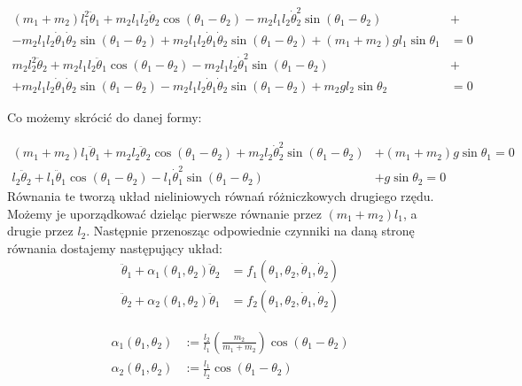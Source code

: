 \documentclass[]{article}
\begin{document}
		\begin{align*}
		(m_1 + m_2) l_1^2 \ddot{\theta}_1 + m_2 l_1 l_2 \ddot{\theta}_2 \cos(\theta_1 - \theta_2)  
		- m_2 l_1 l_2 \dot{\theta}_2^2 \sin(\theta_1 - \theta_2)&+\\
		- m_2 l_1 l_2 \dot{\theta}_1 \dot{\theta}_2 \sin(\theta_1 - \theta_2)+ m_2 l_1 l_2 \dot{\theta}_1 \dot{\theta}_2 \sin(\theta_1 - \theta_2) + (m_1 + m_2) g l_1 \sin \theta_1 &= 0 \\
		m_2 l_2^2 \ddot{\theta}_2 + m_2 l_1 l_2 \ddot{\theta}_1 \cos(\theta_1 - \theta_2) - m_2 l_1 l_2 \dot{\theta}_1^2 \sin(\theta_1 - \theta_2) &+\\
		+m_2 l_1 l_2 \dot{\theta}_1 \dot{\theta}_2 \sin(\theta_1 - \theta_2)-m_2 l_1 l_2 \dot{\theta}_1 \dot{\theta}_2 \sin(\theta_1 - \theta_2)+ m_2 g l_2 \sin \theta_2 &= 0
	\end{align*}

	Co możemy skrócić do danej formy:
	
	\begin{align*}
		(m_1 + m_2) l_1 \ddot{\theta}_1 + m_2 l_2 \ddot{\theta}_2 \cos(\theta_1 - \theta_2) 
		+ m_2 l_2 \dot{\theta}_2^2 \sin(\theta_1 - \theta_2) &+ (m_1 + m_2) g \sin \theta_1 = 0 \\
		l_2 \ddot{\theta}_2 + l_1 \ddot{\theta}_1 \cos(\theta_1 - \theta_2) - l_1 \dot{\theta}_1^2 \sin(\theta_1 - \theta_2) &+ g \sin \theta_2 = 0
	\end{align*}
	Równania te tworzą układ  nieliniowych równań różniczkowych drugiego rzędu.
	Możemy je uporządkować dzieląc pierwsze równanie przez $(m_1 + m_2) l_1$, a drugie przez $l_2$. Następnie przenosząc odpowiednie czynniki na daną stronę równania dostajemy następujący układ:
	\begin{align*}
		\ddot{\theta}_1 + \alpha_1(\theta_1, \theta_2) \ddot{\theta}_2 &= f_1(\theta_1, \theta_2, \dot{\theta}_1, \dot{\theta}_2) \\
		\ddot{\theta}_2 + \alpha_2(\theta_1, \theta_2) \ddot{\theta}_1 &= f_2(\theta_1, \theta_2, \dot{\theta}_1, \dot{\theta}_2)
	\end{align*}
	
	
	\begin{align*}
		\alpha_1(\theta_1, \theta_2) &:= \frac{l_2}{l_1} \left( \frac{m_2}{m_1 + m_2} \right) \cos(\theta_1 - \theta_2) \\
		\alpha_2(\theta_1, \theta_2) &:= \frac{l_1}{l_2} \cos(\theta_1 - \theta_2)
	\end{align*}
	
\end{document}
